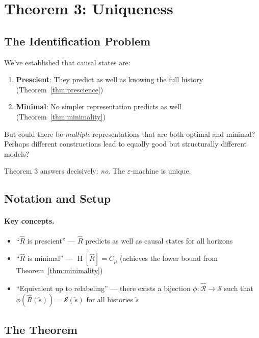 \documentclass[11pt,a4paper]{article}
\theoremstyle{definition}
\theoremstyle{plain}
\newcommand{\eps}{\varepsilon}
\newcommand{\Cmu}{C_\mu}
\newcommand{\calS}{\mathcal{S}}
\newcommand{\past}{\overleftarrow{s}}
\DeclareMathOperator{\Ent}{H}
\begin{document}
\section{Theorem 3: Uniqueness}
\label{sec:theorem-uniqueness}

\subsection{The Identification Problem}

We've established that causal states are:
\begin{enumerate}[nosep]
    \item \textbf{Prescient}: They predict as well as knowing the full history (Theorem~\ref{thm:prescience})
    \item \textbf{Minimal}: No simpler representation predicts as well (Theorem~\ref{thm:minimality})
\end{enumerate}

But could there be \emph{multiple} representations that are both optimal and minimal? Perhaps different constructions lead to equally good but structurally different models?

Theorem 3 answers decisively: \emph{no}. The $\eps$-machine is unique.

\subsection{Notation and Setup}

\paragraph{Key concepts.}
\begin{itemize}[nosep]
    \item ``$\hat{R}$ is prescient'' --- $\hat{R}$ predicts as well as causal states for all horizons
    \item ``$\hat{R}$ is minimal'' --- $\Ent[\hat{R}] = \Cmu$ (achieves the lower bound from Theorem~\ref{thm:minimality})
    \item ``Equivalent up to relabeling'' --- there exists a bijection $\phi: \hat{\mathcal{R}} \to \calS$ such that $\phi(\hat{R}(\past)) = \calS(\past)$ for all histories $\past$
\end{itemize}

\subsection{The Theorem}
\end{document}
